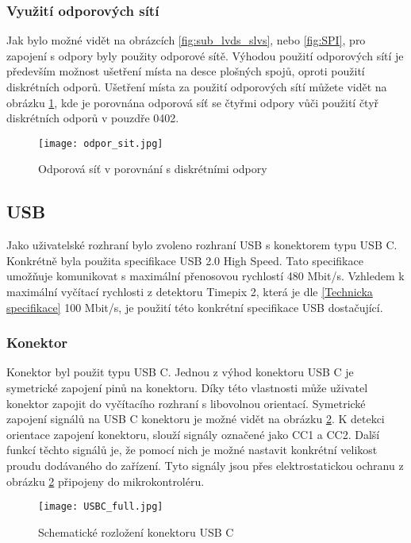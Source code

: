 	\subsubsection{Využití odporových sítí} %
	Jak bylo možné vidět na obrázcích \ref{fig:sub_lvds_slvs}, nebo \ref{fig:SPI}, pro zapojení s odpory byly použity odporové sítě. Výhodou použití odporových sítí je především možnost ušetření místa na desce plošných spojů, oproti použití diskrétních odporů. Ušetření místa za použití odporových sítí můžete vidět na obrázku \ref{fig:odpor_sit}, kde je porovnána odporová síť se čtyřmi odpory vůči použití čtyř diskrétních odporů v pouzdře 0402.
	\begin{figure}[h!]
		\centering
		\captionsetup{justification=centering}
		\texttt{[image: odpor\_sit.jpg]}
		\caption{Odporová síť v porovnání s diskrétními odpory} 
		\label{fig:odpor_sit}
	\end{figure}
	
	\subsection{USB} %
	\label{USB}
	Jako uživatelské rozhraní bylo zvoleno rozhraní USB s konektorem typu USB C. Konkrétně byla použita specifikace USB 2.0 High Speed. Tato specifikace umožňuje komunikovat s maximální přenosovou rychlostí 480 Mbit/s. Vzhledem k maximální vyčítací rychlosti z detektoru Timepix 2, která je dle \ref{Technicka specifikace} 100 Mbit/s, je použití této konkrétní specifikace USB dostačující. 
	\subsubsection{Konektor}
	Konektor byl použit typu USB C. Jednou z výhod konektoru USB C je symetrické zapojení pinů na konektoru. Díky této vlastnosti může uživatel konektor zapojit do vyčítacího rozhraní s libovolnou orientací. Symetrické zapojení signálů na USB C konektoru je možné vidět na obrázku \ref{fig:USBC_full}. K detekci orientace zapojení konektoru, slouží signály označené jako CC1 a CC2. Další funkcí těchto signálů je, že pomocí nich je možné nastavit konkrétní velikost proudu dodávaného do zařízení. Tyto signály jsou přes elektrostatickou ochranu z obrázku \ref{fig:USBC_full} připojeny do mikrokontroléru. 
	\begin{figure}[h!]
		\centering
		\captionsetup{justification=centering}
		\texttt{[image: USBC\_full.jpg]}
		\caption{Schematické rozložení konektoru USB C} 
		\label{fig:USBC_full}
	\end{figure} 

